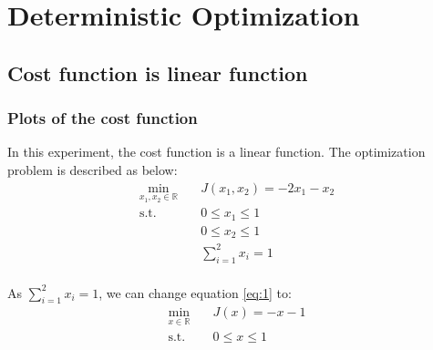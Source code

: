 \documentclass[a4paper,12pt]{article}
\begin{document}


\section{Deterministic Optimization}
\subsection{Cost function is linear function}
\subsubsection{Plots of the cost function }
In this experiment, the cost function is a linear function. The optimization problem is described as below:\\


\begin{equation}\label{eq:1}
\begin{aligned}
\min_{x_1,x_2\in \mathbb{R}} \quad & J(x_1,x_2) = -2x_1-x_2\\
\textrm{s.t.} \quad & 0 \leq x_1 \leq 1\\
              \quad & 0 \leq x_2 \leq 1\\
              \quad & \sum_{i=1}^{2} x_i = 1\\
\end{aligned}
\end{equation}


As $\sum_{i=1}^{2} x_i = 1$, we can change equation \ref{eq:1} to:\\
\begin{equation}\label{eq:2}
\begin{aligned}
\min_{x\in \mathbb{R}} \quad & J(x) = -x-1\\
\textrm{s.t.} \quad & 0 \leq x \leq 1\\
\end{aligned}
\end{equation}
\end{document}
